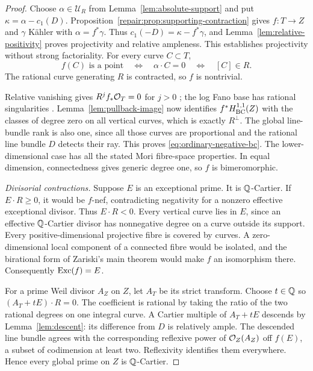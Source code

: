 \begin{proof}
Choose $\alpha\in\mathcal U_R$ from Lemma~\ref{lem:absolute-support}
and put $\kappa=\alpha-c_1(D)$. Proposition~\ref{repair:prop:supporting-contraction}
gives $f:T\to Z$ and $\gamma$ K\"ahler with $\alpha=f^*\gamma$.
Thus $c_1(-D)=\kappa-f^*\gamma$, and
Lemma~\ref{lem:relative-positivity} proves projectivity and relative
ampleness.  This establishes projectivity without strong factoriality.
For every curve $C\subset T$,
\begin{equation}\label{eq:ordinary-contracted-curves}
 f(C)\text{ is a point}\quad\Longleftrightarrow\quad
 \alpha\cdot C=0\quad\Longleftrightarrow\quad[C]\in R.
\end{equation}
The rational curve generating $R$ is contracted, so $f$ is nontrivial.

Relative vanishing gives $R^j f_*\mathcal O_T=0$ for $j>0$
\cite[Theorem~5.2]{Fujino2022}; the log Fano base has rational
singularities \cite[Lemma~8.8]{DHP2024}.  Lemma~\ref{lem:pullback-image}
now identifies $f^*H^{1,1}_{\mathrm{BC}}(Z)$ with the classes of degree zero on all
vertical curves, which is exactly $R^\perp$.  The global line-bundle
rank is also one, since all those curves are proportional and the
rational line bundle $D$ detects their ray.  This proves
\eqref{eq:ordinary-negative-bc}.  The lower-dimensional case has all
the stated Mori fibre-space properties.  In equal dimension,
connectedness gives generic degree one, so $f$ is bimeromorphic.

\smallskip\noindent
\emph{Divisorial contractions.}
Suppose $E$ is an exceptional prime.  It is $\mathbb Q$-Cartier.  If
$E\cdot R\geq0$, it would be $f$-nef, contradicting negativity for a
nonzero effective exceptional divisor.  Thus $E\cdot R<0$.  Every
vertical curve lies in $E$, since an effective $\mathbb Q$-Cartier divisor
has nonnegative degree on a curve outside its support.  Every
positive-dimensional projective fibre is covered by curves.  A
zero-dimensional local component of a connected fibre would be isolated,
and the birational form of Zariski's main theorem would make $f$ an
isomorphism there.  Consequently $\operatorname{Exc}(f)=E$.

For a prime Weil divisor $A_Z$ on $Z$, let $A_T$ be its strict transform.
Choose $t\in\mathbb Q$ so $(A_T+tE)\cdot R=0$.  The coefficient is rational
by taking the ratio of the two rational degrees on one integral curve.
A Cartier multiple of $A_T+tE$ descends by Lemma~\ref{lem:descent}:
its difference from $D$ is relatively ample.  The descended line bundle
agrees with the corresponding reflexive power of $\mathcal O_Z(A_Z)$ off
$f(E)$, a subset of codimension at least two.  Reflexivity identifies
them everywhere.  Hence every global prime on $Z$ is $\mathbb Q$-Cartier.


\end{proof}
